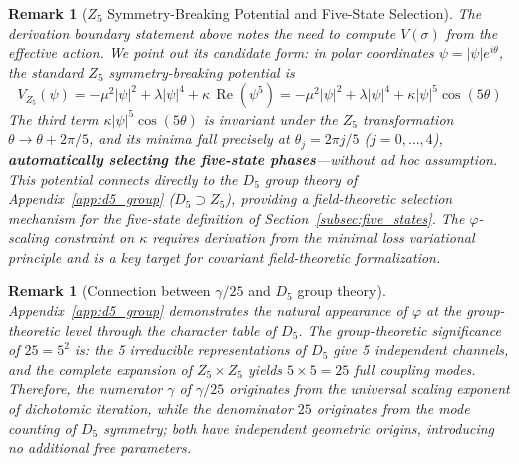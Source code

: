 \documentclass[12pt,a4paper,twocolumn]{article}
\renewcommand{\phi}{\varphi}
\newtheorem{remark}[theorem]{Remark}
\begin{document}
\begin{remark}[$Z_5$ Symmetry-Breaking Potential and Five-State Selection]
\label{rmk:z5_potential}
The derivation boundary statement above notes the need to compute $V(\sigma)$ from the effective action. We point out its candidate form: in polar coordinates $\psi = |\psi|e^{i\theta}$, the standard $Z_5$ symmetry-breaking potential is
\begin{equation}
V_{Z_5}(\psi) = -\mu^2|\psi|^2 + \lambda|\psi|^4 + \kappa\,\operatorname{Re}(\psi^5) = -\mu^2|\psi|^2 + \lambda|\psi|^4 + \kappa|\psi|^5\cos(5\theta)
\end{equation}
The third term $\kappa|\psi|^5\cos(5\theta)$ is invariant under the $Z_5$ transformation $\theta \to \theta + 2\pi/5$, and its minima fall precisely at $\theta_j = 2\pi j/5$ ($j=0,\ldots,4$), \textbf{automatically selecting the five-state phases}---without ad hoc assumption. This potential connects directly to the $D_5$ group theory of Appendix~\ref{app:d5_group} ($D_5 \supset Z_5$), providing a field-theoretic selection mechanism for the five-state definition of Section~\ref{subsec:five_states}. The $\phi$-scaling constraint on $\kappa$ requires derivation from the minimal loss variational principle and is a key target for covariant field-theoretic formalization.
\end{remark}

\begin{remark}[Connection between $\gamma/25$ and $D_5$ group theory]
Appendix~\ref{app:d5_group} demonstrates the natural appearance of $\phi$ at the group-theoretic level through the character table of $D_5$. The group-theoretic significance of $25=5^2$ is: the 5 irreducible representations of $D_5$ give 5 independent channels, and the complete expansion of $Z_5 \times Z_5$ yields $5 \times 5 = 25$ full coupling modes. Therefore, the numerator $\gamma$ of $\gamma/25$ originates from the universal scaling exponent of dichotomic iteration, while the denominator $25$ originates from the mode counting of $D_5$ symmetry; both have independent geometric origins, introducing no additional free parameters.
\end{remark}
\end{document}

